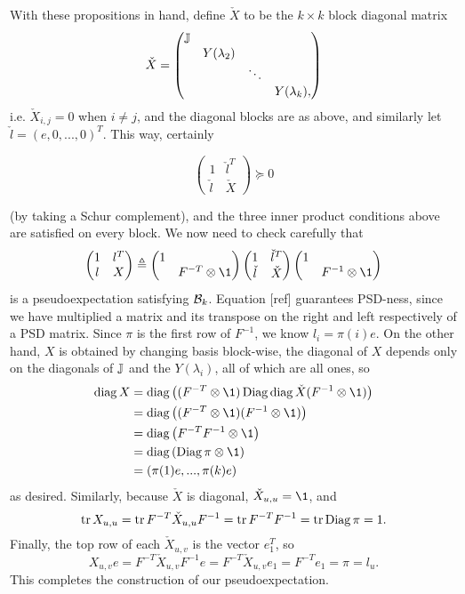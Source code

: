 \noindent With these propositions in hand, define $\check X$ to be the $k\times k$ block diagonal matrix
$$
    \check X = \begin{pmatrix} 
        \mathbb{J} & & & \\
           &Y(\lambda_2)& & \\
           & &\ddots & \\
           & & & Y(\lambda_k),
    \end{pmatrix}
$$
i.e. $\check X_{i,j} = 0$ when $i\neq j$, and the diagonal blocks are as above, and similarly let $\check l = (e,0,...,0)^T$. This way, certainly 

\begin{equation}
    \begin{pmatrix} 1 & \check l^T \\ \check l & \check X \end{pmatrix} \succeq 0  
\end{equation}
 
\noindent (by taking a Schur complement), and the three inner product conditions above are satisfied on every block. We now need to check carefully that 
$$
    \begin{pmatrix} 1 & l^T \\ l & X \end{pmatrix}
    \triangleq \begin{pmatrix} 1 & \\ & F^{-T}\otimes \1 \end{pmatrix} \begin{pmatrix} 1 & \check l^T \\ \check l & \check X \end{pmatrix} \begin{pmatrix} 1 & \\ & F^{-1}\otimes \1 \end{pmatrix}
$$
is a pseudoexpectation satisfying $\mathcal{B}_k$. Equation [ref] guarantees PSD-ness, since we have multiplied a matrix and its transpose on the right and left respectively of a PSD matrix. Since $\pi$ is the first row of $F^{-1}$, we know $l_i = \pi(i)e$. On the other hand, $X$ is obtained by changing basis block-wise, the diagonal of $X$ depends only on the diagonals of $\mathbb{J}$ and the $Y(\lambda_i)$, all of which are all ones, so
\begin{align*}
    \diag X 
    &= \diag\big((F^{-T}\otimes \1)\Diag\diag \check X (F^{-1}\otimes \1)\big) \\
    &=\diag\big((F^{-T}\otimes \1) (F^{-1}\otimes \1)\big) \\
    &= \diag\left(F^{-T}F^{-1} \otimes \1\right) \\
    &= \diag\left(\Diag\pi \otimes \1\right) \\
    &= (\pi(1)e,...,\pi(k)e)
\end{align*}
as desired. Similarly, because $\check X$ is diagonal, $\check X_{u,u} = \1$, and
$$
    \operatorname{tr} X_{u,u} = \operatorname{tr} F^{-T}\check X_{u,u} F^{-1} = \operatorname{tr} F^{-T}F^{-1} = \operatorname{tr} \operatorname{Diag} \pi = 1.
$$
Finally, the top row of each $\check X_{u,v}$ is the vector $e_1^T$, so
$$
    X_{u,v}e = F^{-T}\check X_{u,v}F^{-1}e = F^{-T}\check X_{u,v}e_1 = F^{-T}e_1 = \pi = l_u.
$$
This completes the construction of our pseudoexpectation.

